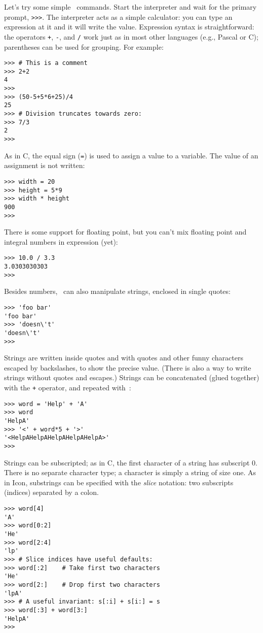 Let's try some simple \Python\ commands.
Start the interpreter and wait for the primary prompt,
{\tt >>>}.
The interpreter acts as a simple calculator: you can type an expression
at it and it will write the value.
Expression syntax is straightforward: the operators
{\tt +},
{\tt -},
{\tt *}
and
{\tt /}
work just as in most other languages (e.g., Pascal or C); parentheses
can be used for grouping.
For example:
\bcode\begin{verbatim}
>>> # This is a comment
>>> 2+2
4
>>> 
>>> (50-5+5*6+25)/4
25
>>> # Division truncates towards zero:
>>> 7/3
2
>>> 
\end{verbatim}\ecode
As in C, the equal sign ({\tt =}) is used to assign a value to a variable.
The value of an assignment is not written:
\bcode\begin{verbatim}
>>> width = 20
>>> height = 5*9
>>> width * height
900
>>> 
\end{verbatim}\ecode
There is some support for floating point, but you can't mix floating
point and integral numbers in expression (yet):
\bcode\begin{verbatim}
>>> 10.0 / 3.3
3.0303030303
>>> 
\end{verbatim}\ecode
Besides numbers, \Python\ can also manipulate strings, enclosed in single
quotes:
\bcode\begin{verbatim}
>>> 'foo bar'
'foo bar'
>>> 'doesn\'t'
'doesn\'t'
>>> 
\end{verbatim}\ecode
Strings are written inside quotes and with quotes and other funny
characters escaped by backslashes, to show the precise value.
(There is also a way to write strings without quotes and escapes.)
Strings can be concatenated (glued together) with the
{\tt +}
operator, and repeated with~{\tt *}:
\bcode\begin{verbatim}
>>> word = 'Help' + 'A'
>>> word
'HelpA'
>>> '<' + word*5 + '>'
'<HelpAHelpAHelpAHelpAHelpA>'
>>> 
\end{verbatim}\ecode
Strings can be subscripted; as in C, the first character of a string has
subscript 0.
There is no separate character type; a character is simply a string of
size one.
As in Icon, substrings can be specified with the
{\em slice}
notation: two subscripts (indices) separated by a colon.
\bcode\begin{verbatim}
>>> word[4]
'A'
>>> word[0:2]
'He'
>>> word[2:4]
'lp'
>>> # Slice indices have useful defaults:
>>> word[:2]    # Take first two characters
'He'
>>> word[2:]    # Drop first two characters
'lpA'
>>> # A useful invariant: s[:i] + s[i:] = s
>>> word[:3] + word[3:]
'HelpA'
>>> 
\end{verbatim}\ecode
